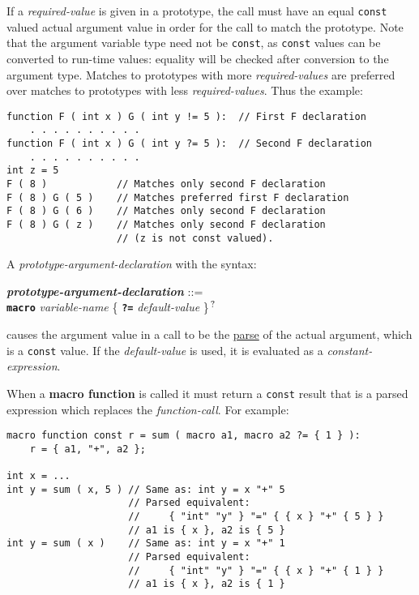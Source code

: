 \documentclass[12pt]{article}
\newcommand{\TT}[1]{{\tt \bfseries #1}}
\newcommand{\QMARK}{{$^{\,\mbox{\footnotesize ?}}$}}
\newcommand{\key}[1]{{\rm \bfseries #1}}
\newcommand{\emkey}[1]{{\em \bfseries #1}}
\newenvironment{indpar}[1][0.3in]%
	{\begin{list}{}%
		     {\setlength{\itemsep}{0in}%
		      \setlength{\topsep}{0in}%
		      \setlength{\parsep}{1ex}%
		      \setlength{\labelwidth}{#1}%
		      \setlength{\leftmargin}{#1}%
		      \addtolength{\leftmargin}{\labelsep}}%
	 \item}%
	{\end{list}}
\begin{document}
If a {\em required-value} is given in a prototype, the call must
have an equal {\tt const} valued actual argument value
in order for the call to match the prototype.
Note that the argument variable type need not be {\tt const},
as {\tt const} values can be converted to run-time values:
equality will be checked after conversion to the argument type.
Matches to prototypes with more {\em required-values}
are preferred over matches to prototypes with less {\em required-values}.
Thus the example:
\begin{indpar}\begin{verbatim}
function F ( int x ) G ( int y != 5 ):  // First F declaration
    . . . . . . . . . .
function F ( int x ) G ( int y ?= 5 ):  // Second F declaration
    . . . . . . . . . .
int z = 5
F ( 8 )            // Matches only second F declaration
F ( 8 ) G ( 5 )    // Matches preferred first F declaration
F ( 8 ) G ( 6 )    // Matches only second F declaration
F ( 8 ) G ( z )    // Matches only second F declaration
                   // (z is not const valued).
\end{verbatim}\end{indpar}

A {\em prototype-argument-declaration} with the syntax:
\begin{indpar}
\emkey{prototype-argument-declaration}\label{MACRO-ARGUMENT-DECLARATION} ::= \\
\hspace*{1in} \TT{macro} {\em variable-name}
                         \{ \TT{?=} {\em default-value} \}\QMARK{}
\end{indpar}
causes the argument value in a call to be the \underline{parse}
of the actual argument, which is a {\tt const} value.  If the
{\em default-value} is used, it is evaluated as a {\em constant-expression}.

When a \key{macro function} is called it must return a {\tt const} result
that is a parsed expression which replaces
the {\em function-call}.  For example:
\begin{indpar}\begin{verbatim}
macro function const r = sum ( macro a1, macro a2 ?= { 1 } ):
    r = { a1, "+", a2 };
    
int x = ...
int y = sum ( x, 5 ) // Same as: int y = x "+" 5
                     // Parsed equivalent:
                     //     { "int" "y" } "=" { { x } "+" { 5 } }
                     // a1 is { x }, a2 is { 5 }
int y = sum ( x )    // Same as: int y = x "+" 1
                     // Parsed equivalent:
                     //     { "int" "y" } "=" { { x } "+" { 1 } }
                     // a1 is { x }, a2 is { 1 }
\end{verbatim}\end{indpar}
\end{document}
